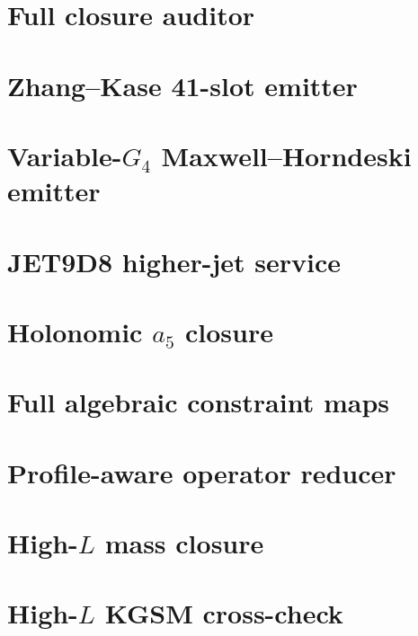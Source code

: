 \documentclass[11pt,a4paper,oneside]{book}
\begin{document}
\section{Full closure auditor}

\section{Zhang--Kase 41-slot emitter}

\section{Variable-$G_4$ Maxwell--Horndeski emitter}

\section{JET9D8 higher-jet service}

\section{Holonomic $a_5$ closure}

\section{Full algebraic constraint maps}

\section{Profile-aware operator reducer}

\section{High-$L$ mass closure}

\section{High-$L$ KGSM cross-check}

\end{document}
